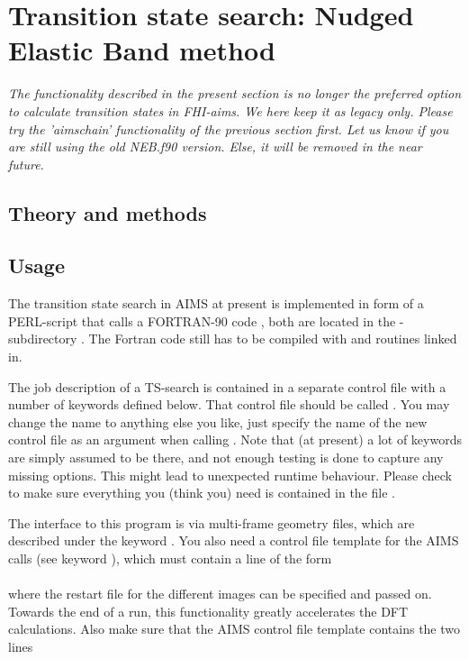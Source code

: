 \newcommand{\doublekeydefinition}[3]
{{\textbf{Tag: \texttt{#1}}{ \color{filename_color} (#2)}}
#3

}
\section{Transition state search: Nudged Elastic Band method}
\label{appendix_NEB}

\emph{The functionality described in the present section is no longer
  the preferred option to calculate transition states in FHI-aims. We
  here keep it as legacy only. Please try the 'aimschain'
  functionality of the previous section first. Let us know if you
  are still using the old NEB.f90 version. Else, it will be removed in
  the near future.}

\subsection{Theory and methods}

\subsection{Usage}
The transition state search in AIMS at present is implemented in 
form of a PERL-script  that calls a FORTRAN-90 code 
, both are located in the -subdirectory
. The Fortran code still has to be compiled with 
 and  routines linked in. 

The job description of a TS-search is contained in a separate control 
file with a number of keywords defined below. That control file 
should be called . You may change the name
to anything else you like, just specify the name of the new control
file as an argument when calling . Note that (at present)
a lot of keywords are simply assumed to be there, and not enough 
testing is done to capture any missing options. This might lead to 
unexpected runtime behaviour. Please check to make sure everything 
you (think you) need is contained in the file .

The interface to this program is via multi-frame  geometry 
files, which are described under the keyword . 
You also need a control file template for the AIMS calls (see keyword 
), which must contain a line of the 
form \\
\option{>} \\ 
where the restart file for the different images can be specified and 
passed on. Towards the end of a run, this functionality greatly
accelerates the DFT calculations. Also make sure that the AIMS 
control file template contains the two lines \\
   \\
 

